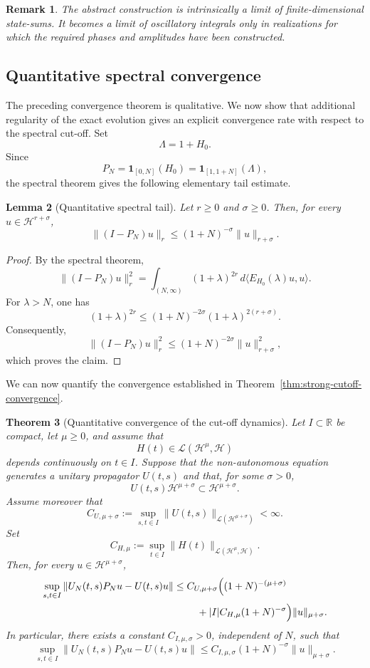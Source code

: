 \documentclass[10pt,a4paper]{amsart}
\newtheorem{theorem}{Theorem}[section]
\newtheorem{lemma}[theorem]{Lemma}
\newtheorem{remark}[theorem]{Remark}
\newcommand{\Hilb}{\mathcal H}
\begin{document}
\begin{remark}
The abstract construction is intrinsically a limit of finite-dimensional
state-sums. It becomes a limit of oscillatory integrals only in realizations
for which the required phases and amplitudes have been constructed.
\end{remark}

\subsection{Quantitative spectral convergence}
\label{subsec:quantitative-spectral-convergence}

The preceding convergence theorem is qualitative. We now show that additional
regularity of the exact evolution gives an explicit convergence rate with
respect to the spectral cut-off. Set
\[
\Lambda=1+H_{0}.
\]
Since
\[
P_{N}=\mathbf{1}_{[0,N]}(H_{0})
      =\mathbf{1}_{[1,1+N]}(\Lambda),
\]
the spectral theorem gives the following elementary tail estimate.

\begin{lemma}[Quantitative spectral tail]
\label{lem:quantitative-spectral-tail}
Let \(r\geq 0\) and \(\sigma\geq 0\). Then, for every
\(u\in\Hilb^{r+\sigma}\),
\[
\|(I-P_{N})u\|_{r}
\leq
(1+N)^{-\sigma}\|u\|_{r+\sigma}.
\]
\end{lemma}

\begin{proof}
By the spectral theorem,
\[
\|(I-P_{N})u\|_{r}^{2}
=
\int_{(N,\infty)}
(1+\lambda)^{2r}\,d\langle E_{H_{0}}(\lambda)u,u\rangle.
\]
For \(\lambda>N\), one has
\[
(1+\lambda)^{2r}
\leq
(1+N)^{-2\sigma}(1+\lambda)^{2(r+\sigma)}.
\]
Consequently,
\[
\|(I-P_{N})u\|_{r}^{2}
\leq
(1+N)^{-2\sigma}\|u\|_{r+\sigma}^{2},
\]
which proves the claim.
\end{proof}

We can now quantify the convergence established in
Theorem~\ref{thm:strong-cutoff-convergence}.

\begin{theorem}[Quantitative convergence of the cut-off dynamics]
\label{thm:quantitative-cutoff-convergence}
Let \(I\subset\mathbb{R}\) be compact, let \(\mu\geq 0\), and assume that
\[
H(t)\in\mathcal{L}(\Hilb^{\mu},\Hilb)
\]
depends continuously on \(t\in I\). Suppose that the non-autonomous equation
generates a unitary propagator \(U(t,s)\) and that, for some \(\sigma>0\),
\[
U(t,s)\Hilb^{\mu+\sigma}
\subset
\Hilb^{\mu+\sigma}.
\]
Assume moreover that
\[
C_{U,\mu+\sigma}
:=
\sup_{s,t\in I}
\|U(t,s)\|_{\mathcal{L}(\Hilb^{\mu+\sigma})}
<\infty.
\]
Set
\[
C_{H,\mu}
:=
\sup_{t\in I}
\|H(t)\|_{\mathcal{L}(\Hilb^{\mu},\Hilb)}.
\]
Then, for every \(u\in\Hilb^{\mu+\sigma}\),
\[
\begin{split}
\sup_{s,t\in I}
\|U_{N}(t,s)P_{N}u-U(t,s)u\|
\leq{}&
C_{U,\mu+\sigma}
\Bigl(
(1+N)^{-(\mu+\sigma)}
\\
&\quad
+
|I|C_{H,\mu}(1+N)^{-\sigma}
\Bigr)
\|u\|_{\mu+\sigma}.
\end{split}
\]
In particular, there exists a constant \(C_{I,\mu,\sigma}>0\),
independent of \(N\), such that
\[
\sup_{s,t\in I}
\|U_{N}(t,s)P_{N}u-U(t,s)u\|
\leq
C_{I,\mu,\sigma}(1+N)^{-\sigma}
\|u\|_{\mu+\sigma}.
\]
\end{theorem}
\end{document}

